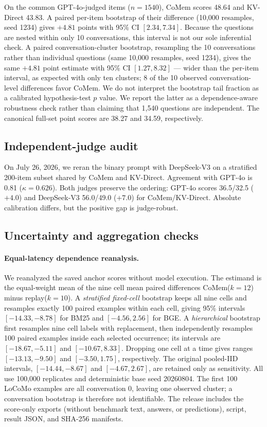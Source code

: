 On the common GPT-4o-judged items ($n{=}1540$), CoMem scores 48.64 and KV-Direct
43.83. A paired per-item bootstrap of their difference (10,000 resamples,
seed 1234) gives $+4.81$ points with 95\% CI $[2.34,7.34]$. Because the questions
are nested within only 10 conversations, this interval is not our sole
inferential check. A paired conversation-cluster bootstrap, resampling the 10
conversations rather than individual questions (same 10,000 resamples,
seed 1234), gives the same $+4.81$ point estimate with 95\% CI $[1.27,8.32]$ ---
wider than the per-item interval, as expected with only ten clusters; 8 of the
10 observed conversation-level differences favor CoMem. We do not interpret
the bootstrap tail fraction as a calibrated hypothesis-test $p$ value. We report the latter as a
dependence-aware robustness check rather than claiming that 1,540 questions are
independent. The canonical full-set point
scores are 38.27 and 34.59, respectively.

\subsection{Independent-judge audit}
On July 26, 2026, we reran the binary prompt with DeepSeek-V3 on a stratified 200-item subset
shared by CoMem and KV-Direct. Agreement with GPT-4o is 0.81
($\kappa=0.626$). Both judges preserve the ordering: GPT-4o scores
36.5/32.5 ($+4.0$) and DeepSeek-V3 56.0/49.0 ($+7.0$) for CoMem/KV-Direct.
Absolute calibration differs, but the positive gap is judge-robust.

\subsection{Uncertainty and aggregation checks}
\paragraph{Equal-latency dependence reanalysis.}
We reanalyzed the saved anchor scores without model execution. The estimand is
the equal-weight mean of the nine cell mean paired differences
CoMem($k{=}12$) minus replay($k{=}10$). A \emph{stratified fixed-cell}
bootstrap keeps all nine cells and resamples exactly 100 paired examples within
each cell, giving 95\% intervals $[-14.33,-8.78]$ for BM25 and
$[-4.56,2.56]$ for BGE. A \emph{hierarchical} bootstrap first resamples nine
cell labels with replacement, then independently resamples 100 paired examples
inside each selected occurrence; its intervals are $[-18.67,-5.11]$ and
$[-10.67,8.33]$. Dropping one cell at a time gives ranges
$[-13.13,-9.50]$ and $[-3.50,1.75]$, respectively. The original pooled-IID
intervals, $[-14.44,-8.67]$ and $[-4.67,2.67]$, are retained only as
sensitivity. All use 100,000 replicates and deterministic base seed 20260804.
The first 100 LoCoMo examples are all conversation 0, leaving one observed
cluster; a conversation bootstrap is therefore not identifiable. The release
includes the score-only exports (without benchmark text, answers, or
predictions), script, result JSON, and SHA-256 manifests.

